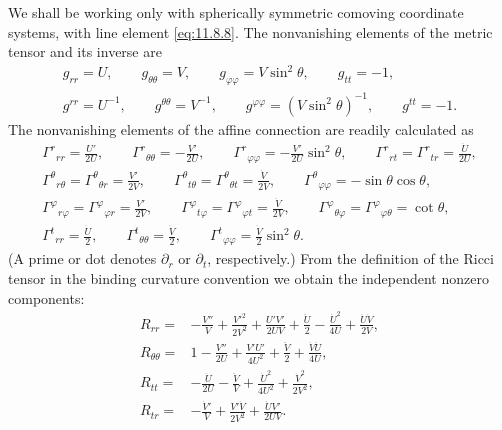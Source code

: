 We shall be working only with spherically symmetric comoving coordinate
systems, with line element \eqref{eq:11.8.8}. The nonvanishing elements of
the metric tensor and its inverse are
\begin{equation}
  \begin{gathered}
  g_{rr}=U,\qquad
  g_{\theta\theta}=V,\qquad
  g_{\varphi\varphi}=V\sin^2\theta,\qquad
  g_{tt}=-1,\\
  g^{rr}=U^{-1},\qquad
  g^{\theta\theta}=V^{-1},\qquad
  g^{\varphi\varphi}=(V\sin^2\theta)^{-1},\qquad
  g^{tt}=-1.
  \end{gathered}
  \tag{11.8.12}\label{eq:11.8.12}
\end{equation}
The nonvanishing elements of the affine connection are readily calculated as
\begin{equation}
  \begin{gathered}
  \Gamma^r{}_{rr}=\frac{U'}{2U},\qquad
  \Gamma^r{}_{\theta\theta}=-\frac{V'}{2U},\qquad
  \Gamma^r{}_{\varphi\varphi}=-\frac{V'}{2U}\sin^2\theta,\qquad
  \Gamma^r{}_{rt}=\Gamma^r{}_{tr}=\frac{\dot U}{2U},\\
  \Gamma^\theta{}_{r\theta}=\Gamma^\theta{}_{\theta r}
    =\frac{V'}{2V},\qquad
  \Gamma^\theta{}_{t\theta}=\Gamma^\theta{}_{\theta t}
    =\frac{\dot V}{2V},\qquad
  \Gamma^\theta{}_{\varphi\varphi}=-\sin\theta\cos\theta,\\
  \Gamma^\varphi{}_{r\varphi}=\Gamma^\varphi{}_{\varphi r}
    =\frac{V'}{2V},\qquad
  \Gamma^\varphi{}_{t\varphi}=\Gamma^\varphi{}_{\varphi t}
    =\frac{\dot V}{2V},\qquad
  \Gamma^\varphi{}_{\theta\varphi}
    =\Gamma^\varphi{}_{\varphi\theta}=\cot\theta,\\
  \Gamma^t{}_{rr}=\frac{\dot U}{2},\qquad
  \Gamma^t{}_{\theta\theta}=\frac{\dot V}{2},\qquad
  \Gamma^t{}_{\varphi\varphi}=\frac{\dot V}{2}\sin^2\theta.
  \end{gathered}
  \tag{11.8.13}\label{eq:11.8.13}
\end{equation}
(A prime or dot denotes \(\partial_r\) or \(\partial_t\), respectively.) From
the definition of the Ricci tensor in the binding curvature convention we
obtain the independent nonzero components:
\begin{align}
  R_{rr}
  ={}&
  -\frac{V''}{V}
  +\frac{V'^2}{2V^2}
  +\frac{U'V'}{2UV}
  +\frac{\ddot U}{2}
  -\frac{\dot U^2}{4U}
  +\frac{\dot U\dot V}{2V},
  \tag{11.8.14}\label{eq:11.8.14}\\
  R_{\theta\theta}
  ={}&
  1-\frac{V''}{2U}
  +\frac{V'U'}{4U^2}
  +\frac{\ddot V}{2}
  +\frac{\dot V\dot U}{4U},
  \tag{11.8.15}\label{eq:11.8.15}\\
  R_{tt}
  ={}&
  -\frac{\ddot U}{2U}
  -\frac{\ddot V}{V}
  +\frac{\dot U^2}{4U^2}
  +\frac{\dot V^2}{2V^2},
  \tag{11.8.16}\label{eq:11.8.16}\\
  R_{tr}
  ={}&
  -\frac{\dot V'}{V}
  +\frac{V'\dot V}{2V^2}
  +\frac{\dot U V'}{2UV}.
  \tag{11.8.17}\label{eq:11.8.17}
\end{align}
